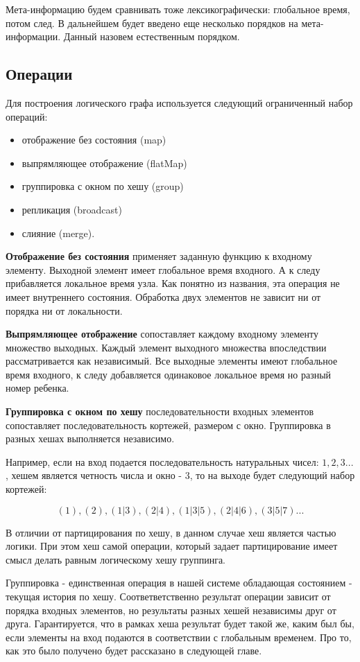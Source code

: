\documentclass[14pt]{matmex-diploma-custom}
\begin{document}
Мета-информацию будем сравнивать тоже лексикографически: глобальное время, потом след. В дальнейшем будет введено еще несколько порядков на мета-информации. Данный назовем естественным порядком.

\subsection{Операции}

Для построения логического графа используется следующий ограниченный набор операций:

\begin{itemize}
  \item отображение без состояния (map)
  \item выпрямляющее отображение (flatMap)
  \item группировка с окном по хешу (group)
  \item репликация (broadcast)
  \item слияние (merge).
\end{itemize}

\textbf{Отображение без состояния} применяет заданную функцию к входному элементу. Выходной элемент имеет глобальное время входного. А к следу прибавляется локальное время узла. Как понятно из названия, эта операция не имеет внутреннего состояния. Обработка двух элементов не зависит ни от порядка ни от локальности.

\textbf{Выпрямляющее отображение} сопоставляет каждому входному элементу множество выходных. Каждый элемент выходного множества впоследствии рассматривается как независимый. Все выходные элементы имеют глобальное время входного, к следу добавляется одинаковое локальное время но разный номер ребенка.

\textbf{Группировка с окном по хешу} последовательности входных элементов сопоставляет последовательность кортежей, размером с окно. Группировка в разных хешах выполняется независимо.

Например, если на вход подается последовательность натуральных чисел: \(1, 2, 3...\) , хешем является четность числа и окно - 3, то на выходе будет следующий набор кортежей:

\[(1), (2), (1|3), (2|4), (1|3|5), (2|4|6), (3|5|7)...\]

В отличии от партицирования по хешу, в данном случае хеш является частью логики. При этом хеш самой операции, который задает партицирование имеет смысл делать равным логическому хешу группинга.

Группировка - единственная операция в нашей системе обладающая состоянием - текущая история по хешу. Соответветственно результат операции зависит от порядка входных элементов, но результаты разных хешей независимы друг от друга. Гарантируется, что в рамках хеша результат будет такой же, каким был бы, если элементы на вход подаются в соответствии с глобальным временем. Про то, как это было получено будет рассказано в следующей главе.
\end{document}
